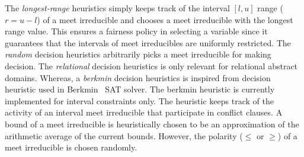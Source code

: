The {\em longest-range} heuristics simply keeps track of the
interval $[l,u]$ range ($r=u-l$) of a meet irreducible and chooses 
a meet irreducible with the longest range value.  This ensures a 
fairness policy in selecting a variable since it guarantees that 
the intervals of meet irreducibles are uniformly restricted.  
%
The {\em random} decision heuristics arbitrarily picks a meet irreducible  
for making decision. 
%
The {\em relational} decision heuristics is only relevant for relational 
abstract domains.  
%
Whereas, a {\em berkmin} decision heuristics is inspired 
from decision heuristic used in Berkmin~\cite{eugoldberg07} SAT solver.  
The berkmin heuristic is currently implemented for interval constraints only.  
The heuristic keeps track of the activity of an interval meet irreducible 
that participate in conflict clauses. 
%
A bound of a meet irreducible is heuristically chosen to be an approximation of the 
arithmetic average of the current bounds.  However, the polarity ($\leq$ or $\geq$) 
of a meet irreducible is chosen randomly.  
